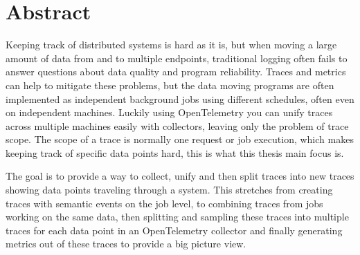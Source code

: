 \chapter{Abstract}

Keeping track of distributed systems is hard as it is, but when moving a large amount of data from and to multiple endpoints, traditional logging often fails to answer questions about data quality and program reliability.
Traces and metrics can help to mitigate these problems, but the data moving programs are often implemented as independent background jobs using different schedules, often even on independent machines.
Luckily using OpenTelemetry you can unify traces across multiple machines easily with collectors, leaving only the problem of trace scope.
The scope of a trace is normally one request or job execution, which makes keeping track of specific data points hard, this is what this thesis main focus is.\par
The goal is to provide a way to collect, unify and then split traces into new traces showing data points traveling through a system. This stretches from creating traces with semantic events on the job level, 
to combining traces from jobs working on the same data, then splitting and sampling these traces into multiple traces for each data point in an OpenTelemetry collector and finally generating metrics out of these traces to provide a big picture view.\par
